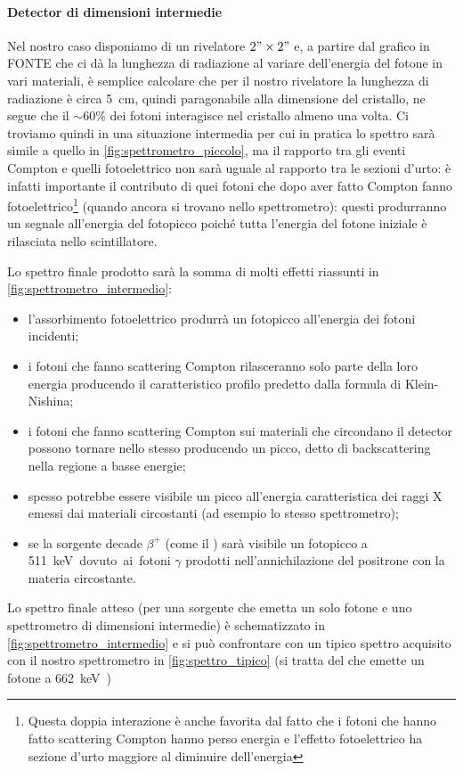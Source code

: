  \paragraph{Detector di dimensioni intermedie}\label{par:spettrometro_intermedio}
 Nel nostro caso disponiamo di un rivelatore $2"\times2"$ e, a partire dal grafico in FONTE che ci dà la lunghezza di radiazione al variare dell'energia del fotone in vari materiali, è semplice calcolare che per il nostro rivelatore la lunghezza di radiazione è circa \SI{5}{cm}, quindi paragonabile alla dimensione del cristallo, ne segue che il $\sim 60\%$ dei fotoni interagisce nel cristallo almeno una volta. Ci troviamo quindi in una situazione intermedia per cui in pratica lo spettro sarà simile a quello in \autoref{fig:spettrometro_piccolo}, ma il rapporto tra gli eventi Compton e quelli fotoelettrico non sarà uguale al rapporto tra le sezioni d'urto: è infatti importante il contributo di quei fotoni che dopo aver fatto Compton fanno fotoelettrico\footnote{Questa doppia interazione è anche favorita dal fatto che i fotoni che hanno fatto scattering Compton hanno perso energia e l'effetto fotoelettrico ha sezione d'urto maggiore al diminuire dell'energia} (quando ancora si trovano nello spettrometro): questi produrranno un segnale all'energia del fotopicco poiché tutta l'energia del fotone iniziale è rilasciata nello scintillatore. 
 
 Lo spettro finale prodotto sarà la somma di molti effetti riassunti in \autoref{fig:spettrometro_intermedio}:
 \begin{itemize}
 	\item l'assorbimento fotoelettrico produrrà un fotopicco all'energia dei fotoni incidenti;
 	\item i fotoni che fanno scattering Compton rilasceranno solo parte della loro energia producendo il caratteristico profilo predetto dalla  formula di Klein-Nishina;
 	\item i fotoni che fanno scattering Compton sui materiali che circondano il detector possono tornare nello stesso producendo un picco, detto di backscattering nella regione a basse energie;
 	\item spesso potrebbe essere visibile un picco all'energia caratteristica dei raggi X emessi dai materiali circostanti (ad esempio lo stesso spettrometro);
 	\item se la sorgente decade $\beta^+$ (come il \na) sarà visibile un fotopicco a \SI{511}keV dovuto ai fotoni $\gamma$ prodotti nell'annichilazione del positrone con la materia circostante.
 \end{itemize}
Lo spettro finale atteso (per una sorgente che emetta un solo fotone e uno spettrometro di dimensioni intermedie) è schematizzato in \autoref{fig:spettrometro_intermedio} e si può confrontare con un tipico spettro acquisito con il nostro spettrometro in \autoref{fig:spettro_tipico} (si tratta del \cs\; che emette un fotone a \SI{662}keV)

